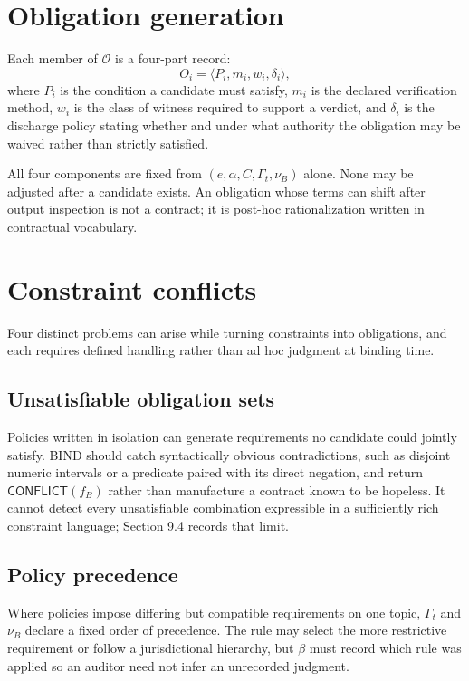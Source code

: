 \documentclass[11pt,openany]{book}
\begin{document}
\section{Obligation generation}

Each member of \(\mathcal O\) is a four-part record:
\[
 O_i=\langle P_i,m_i,w_i,\delta_i\rangle,
\]
where \(P_i\) is the condition a candidate must satisfy, \(m_i\) is the
declared verification method, \(w_i\) is the class of witness required to
support a verdict, and \(\delta_i\) is the discharge policy stating whether and
under what authority the obligation may be waived rather than strictly
satisfied.

All four components are fixed from \((e,\alpha,C,\Gamma_t,\nu_B)\) alone.
None may be adjusted after a candidate exists. An obligation whose terms can
shift after output inspection is not a contract; it is post-hoc
rationalization written in contractual vocabulary.

\section{Constraint conflicts}

Four distinct problems can arise while turning constraints into obligations,
and each requires defined handling rather than ad hoc judgment at binding time.

\subsection{Unsatisfiable obligation sets}

Policies written in isolation can generate requirements no candidate could
jointly satisfy. BIND should catch syntactically obvious contradictions, such
as disjoint numeric intervals or a predicate paired with its direct negation,
and return \(\mathsf{CONFLICT}(f_B)\) rather than manufacture a contract known
to be hopeless. It cannot detect every unsatisfiable combination expressible
in a sufficiently rich constraint language; Section 9.4 records that limit.

\subsection{Policy precedence}

Where policies impose differing but compatible requirements on one topic,
\(\Gamma_t\) and \(\nu_B\) declare a fixed order of precedence. The rule may
select the more restrictive requirement or follow a jurisdictional hierarchy,
but \(\beta\) must record which rule was applied so an auditor need not infer an
unrecorded judgment.
\end{document}
